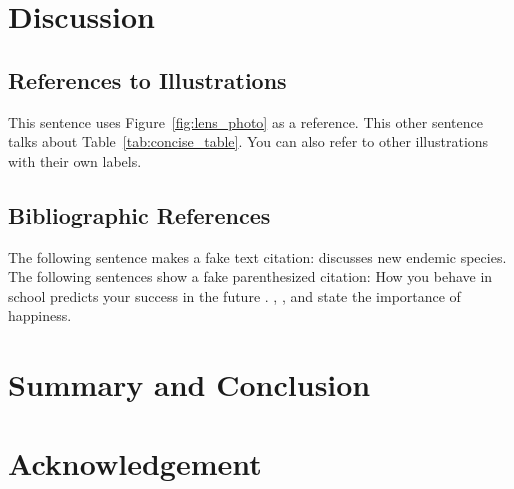 \documentclass{strrespaper-journ}
\newcommand{\fillertext}{\lipsum[1][1-5]}
\begin{document}
	\section{Discussion}
		\subsection{References to Illustrations}
			This sentence uses Figure~\ref{fig:lens_photo} as a reference.
			This other sentence talks about Table~\ref{tab:concise_table}.
			You can also refer to other illustrations with their own labels.
		\subsection{Bibliographic References}
			The following sentence makes a fake text citation:
			\textcite{maryaniNewEndemicFusarium2019} discusses new endemic species.
			The following sentences show a fake parenthesized citation:
			How you behave in school predicts your success in the future \autocite{spenglerHowYouBehave2018}.
			\textcite{freyHappinessRevolutionEconomics2008}, \textcite{veenhovenConditionsHappiness2013}, and \textcite{veenhovenHappinessRelative1991} state the importance of happiness.

	\section{Summary and Conclusion}
		\fillertext

	\section{Acknowledgement}
		\fillertext

	\printbibliography
\end{document}
